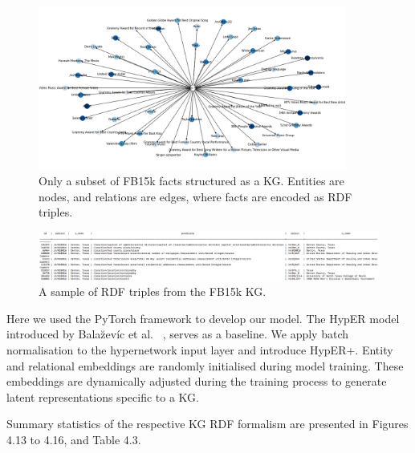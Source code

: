 \begin{figure}[H]
   	\centering
    	\includegraphics[width=0.9\textwidth, height=0.5\textwidth]{FB15k_Graph}
	\caption{Only a subset of FB15k facts structured as a KG. Entities are nodes, and relations are edges, where facts are encoded as RDF triples.}
\end{figure}

\begin{figure}[H]
   	\centering
    	\includegraphics[width=1.0\textwidth, height=0.3\textwidth]{fb15k_fact_sample}
	\caption{A sample of RDF triples from the FB15k KG.}
\end{figure}

\noindent Here we used the PyTorch framework to develop our model. The HypER model introduced by Bala\u{z}ev\'{i}c et al. \unskip ~\citep{balazevic2019hypernetwork}, serves as a baseline. We apply batch normalisation to the hypernetwork input layer and introduce HypER+. Entity and relational embeddings are randomly initialised during model training. These embeddings are dynamically adjusted during the training process to generate latent representations specific to a KG.

\noindent Summary statistics of the respective KG RDF formalism are presented in Figures 4.13 to 4.16, and Table 4.3. 



